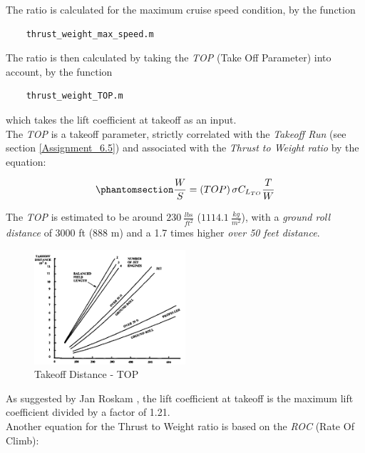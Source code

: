 \documentclass{article}
\begin{document}
The ratio is calculated for the maximum cruise speed condition, by the function 
\begin{verbatim}
    thrust_weight_max_speed.m
\end{verbatim}


The ratio is then calculated by taking the \textit{TOP} (Take Off Parameter) into account, by the function 
\begin{verbatim}
    thrust_weight_TOP.m
\end{verbatim}
which takes the lift coefficient at takeoff as an input.\\ 

The \textit{TOP} is a takeoff parameter, strictly correlated with the \textit{Takeoff Run} (see section \ref{Assignment_6.5}) and associated
with the \textit{Thrust to Weight ratio} by the equation:

\begin{equation}
    \phantomsection
    \label{thrust_weight_equation_TOP}
    \frac{W}{S} = \left(TOP\right)\sigma C_{L_{TO}} \frac{T}{W} 
\end{equation}

The \textit{TOP} is estimated to be around $230 \ \frac{lbs}{ft^2}$ ($1114.1 \ \frac{kg}{m^2}$), with a \textit{ground roll distance}
of 3000 ft (888 m) and a 1.7 times higher \textit{over 50 feet distance}.\\ 

\begin{figure}[h!]
    \centering
    \includegraphics[width=0.5\textwidth]{Sources/Plots_and_Pictures/TOP.png}
    \caption{Takeoff Distance - TOP \autocite{Raymer_Daniel}}
    \label{TOP}
\end{figure}
As suggested by Jan Roskam \autocite{Roskam}, the lift coefficient at takeoff is the maximum lift coefficient
divided by a factor of 1.21. \\ 

Another equation for the Thrust to Weight ratio is based on the \textit{ROC} (Rate Of Climb):
\end{document}
